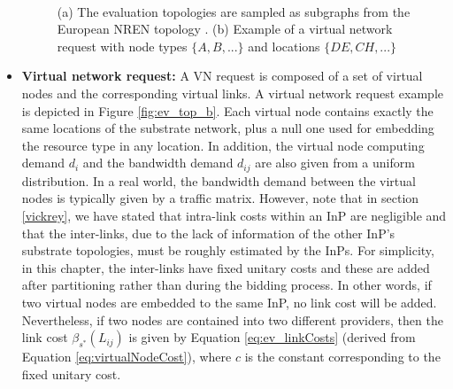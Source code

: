 \begin{itemize}
\begin{figure}[bth]
	\myfloatalign
	 \quad
	 \\
	\caption{(a) The evaluation topologies are sampled as subgraphs from the European NREN topology \citep{zoo}. (b) Example of a virtual network request with node types $\{A, B, ...\}$ and locations $\{DE, CH, ...\}$ }
	\label{fig:ev_top}
\end{figure}

\item \textbf{Virtual network request:} A VN request is composed of a set of virtual nodes and the corresponding virtual links. A virtual network request example is depicted in Figure \ref{fig:ev_top_b}. Each virtual node contains exactly the same locations of the substrate network, plus a null one used for embedding the resource type in any location. In addition, the virtual node computing demand $d_i$ and the bandwidth demand $d_{ij}$ are also given from a uniform distribution. In a real world, the bandwidth demand between the virtual nodes is typically given by a traffic matrix. However, note that in section \ref{vickrey}, we have stated that intra-link costs within an InP are negligible and that the inter-links, due to the lack of information of the other InP's substrate topologies, must be roughly estimated by the InPs. For simplicity, in this chapter, the inter-links have fixed unitary costs and these are added after partitioning rather than during the bidding process. In other words, if two virtual nodes are embedded to the same InP, no link cost will be added. Nevertheless, if two nodes are contained into two different providers, then the link cost $\beta_{s^{*}}(L_{ij})$ is given by Equation \ref{eq:ev_linkCosts} (derived from Equation \ref{eq:virtualNodeCost}), where $c$ is the constant corresponding to the fixed unitary cost.


\end{itemize}
